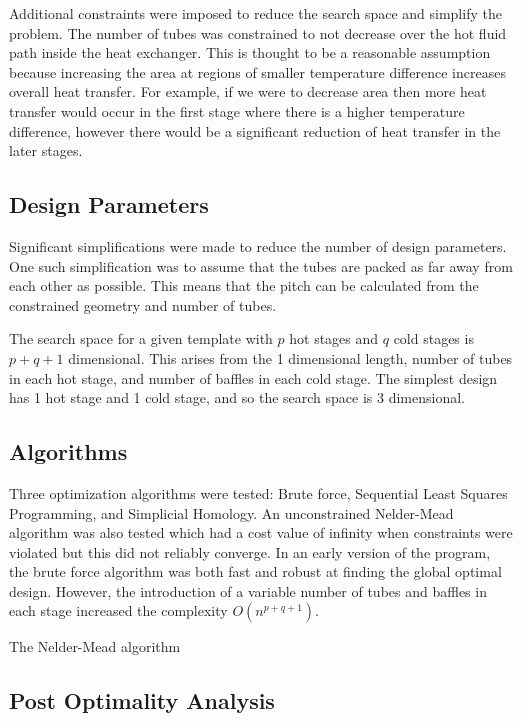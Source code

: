 \documentclass{article}
\begin{document}
Additional constraints were imposed to reduce the search space and simplify the problem.
The number of tubes was constrained to not decrease over the hot fluid path inside the heat exchanger.
This is thought to be a reasonable assumption because increasing the area at regions of smaller temperature difference increases overall heat transfer.
For example, if we were to decrease area then more heat transfer would occur in the first stage where there is a higher temperature difference, however there would be a significant reduction of heat transfer in the later stages.

\subsection{Design Parameters}

Significant simplifications were made to reduce the number of design parameters.
One such simplification was to assume that the tubes are packed as far away from each other as possible.
This means that the pitch can be calculated from the constrained geometry and number of tubes.

The search space for a given template with $p$ hot stages and $q$ cold stages is $p + q + 1$ dimensional.
This arises from the 1 dimensional length, number of tubes in each hot stage, and number of baffles in each cold stage.
The simplest design has 1 hot stage and 1 cold stage, and so the search space is 3 dimensional.

\subsection{Algorithms}
Three optimization algorithms were tested: Brute force, Sequential Least Squares Programming, and Simplicial Homology.
An unconstrained Nelder-Mead algorithm was also tested which had a cost value of infinity when constraints were violated but this did not reliably converge.
In an early version of the program, the brute force algorithm was both fast and robust at finding the global optimal design.
However, the introduction of a variable number of tubes and baffles in each stage increased the complexity $O(n^{p+q+1})$.

The Nelder-Mead algorithm

\subsection{Post Optimality Analysis}
\end{document}
